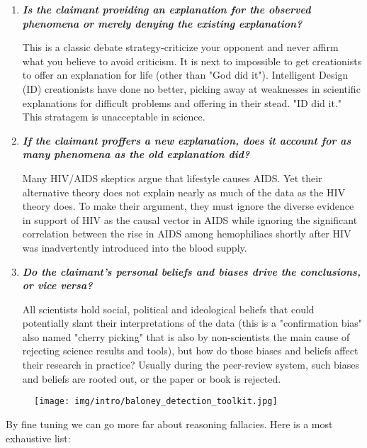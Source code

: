 \begin{enumerate}
		\item \textit{\textbf{Is the claimant providing an explanation for the observed phenomena or merely 
             denying the existing explanation?}}
	
		This is a classic debate strategy-criticize your opponent and never affirm what you believe to avoid criticism. It is next to impossible to get creationists to offer an explanation for life (other than "God did it"). Intelligent Design (ID) creationists have done no better, picking away at weaknesses in scientific explanations for difficult problems and offering in their stead. "ID did it." This stratagem is unacceptable in science.

		\item \textit{\textbf{If the claimant proffers a new explanation, does it account for as many phenomena as the old explanation did?}}
	
		Many HIV/AIDS skeptics argue that lifestyle causes AIDS. Yet their alternative theory does not explain nearly as much of the data as the HIV theory does. To make their argument, they must ignore the diverse evidence in support of HIV as the causal vector in AIDS while ignoring the significant correlation between the rise in AIDS among hemophiliacs shortly after HIV was inadvertently introduced into the blood supply.

		\item \textit{\textbf{Do the claimant's personal beliefs and biases drive the conclusions, or vice versa?}}

		All scientists hold social, political and ideological beliefs that could potentially slant their interpretations of the data (this is a "confirmation bias" also named "cherry picking" that is also by non-scientists the main cause of rejecting science results and tools), but how do those biases and beliefs affect their research in practice? Usually during the peer-review system, such biases and beliefs are rooted out, or the paper or book is rejected.  
	\end{enumerate}
	\begin{figure}[H]
		\centering
		\texttt{[image: img/intro/baloney\_detection\_toolkit.jpg]}
	\end{figure}
	By fine tuning we can go more far about reasoning fallacies. Here is a most exhaustive list:
